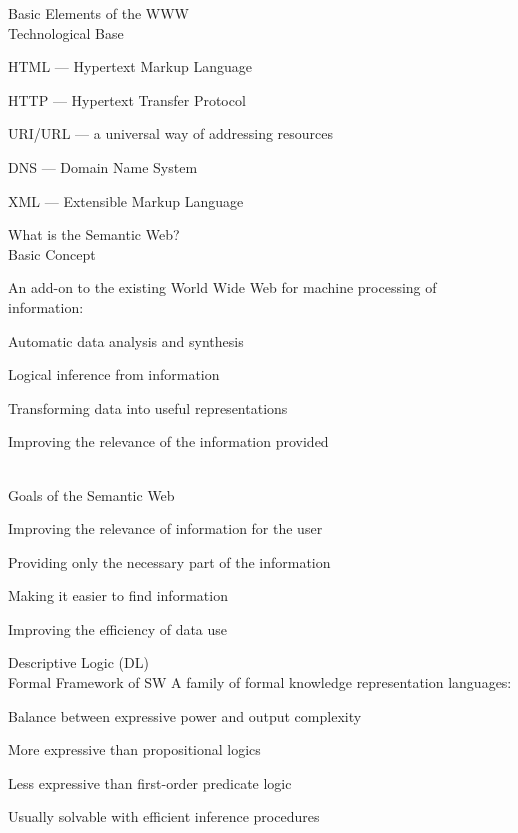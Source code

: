 \begin{frame}{Basic Elements of the WWW\\Technological Base}
	\topline
	\justifying
	
	\begin{textitemize}
		\item HTML --- Hypertext Markup Language
		\item HTTP --- Hypertext Transfer Protocol
		\item URI/URL --- a universal way of addressing resources
		\item DNS --- Domain Name System
		\item XML --- Extensible Markup Language
	\end{textitemize}
\end{frame}

\begin{frame}{What is the Semantic Web?\\Basic Concept}
	\topline
	\justifying
	
	An add-on to the existing World Wide Web for machine processing of information:
	\begin{textitemize}
		\item Automatic data analysis and synthesis
		\item Logical inference from information
		\item Transforming data into useful representations
		\item Improving the relevance of the information provided
	\end{textitemize}
\end{frame}

\begin{frame}{\\Goals of the Semantic Web}
	\topline
	\justifying
	
	\begin{textitemize}
		\item Improving the relevance of information for the user
		\item Providing only the necessary part of the information
		\item Making it easier to find information
		\item Improving the efficiency of data use
	\end{textitemize}
\end{frame}

\begin{frame}{Descriptive Logic (DL)\\Formal Framework of SW}
	\topline
	\justifying
	A family of formal knowledge representation languages:
	\begin{textitemize}
		\item Balance between expressive power and output complexity
		\item More expressive than propositional logics
		\item Less expressive than first-order predicate logic
		\item Usually solvable with efficient inference procedures
	\end{textitemize}
\end{frame}

